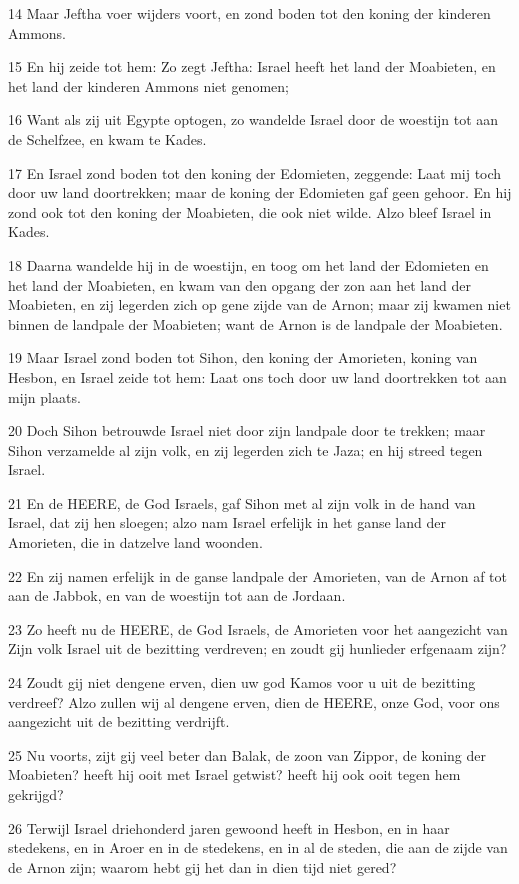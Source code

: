 \par 14 Maar Jeftha voer wijders voort, en zond boden tot den koning der kinderen Ammons.
\par 15 En hij zeide tot hem: Zo zegt Jeftha: Israel heeft het land der Moabieten, en het land der kinderen Ammons niet genomen;
\par 16 Want als zij uit Egypte optogen, zo wandelde Israel door de woestijn tot aan de Schelfzee, en kwam te Kades.
\par 17 En Israel zond boden tot den koning der Edomieten, zeggende: Laat mij toch door uw land doortrekken; maar de koning der Edomieten gaf geen gehoor. En hij zond ook tot den koning der Moabieten, die ook niet wilde. Alzo bleef Israel in Kades.
\par 18 Daarna wandelde hij in de woestijn, en toog om het land der Edomieten en het land der Moabieten, en kwam van den opgang der zon aan het land der Moabieten, en zij legerden zich op gene zijde van de Arnon; maar zij kwamen niet binnen de landpale der Moabieten; want de Arnon is de landpale der Moabieten.
\par 19 Maar Israel zond boden tot Sihon, den koning der Amorieten, koning van Hesbon, en Israel zeide tot hem: Laat ons toch door uw land doortrekken tot aan mijn plaats.
\par 20 Doch Sihon betrouwde Israel niet door zijn landpale door te trekken; maar Sihon verzamelde al zijn volk, en zij legerden zich te Jaza; en hij streed tegen Israel.
\par 21 En de HEERE, de God Israels, gaf Sihon met al zijn volk in de hand van Israel, dat zij hen sloegen; alzo nam Israel erfelijk in het ganse land der Amorieten, die in datzelve land woonden.
\par 22 En zij namen erfelijk in de ganse landpale der Amorieten, van de Arnon af tot aan de Jabbok, en van de woestijn tot aan de Jordaan.
\par 23 Zo heeft nu de HEERE, de God Israels, de Amorieten voor het aangezicht van Zijn volk Israel uit de bezitting verdreven; en zoudt gij hunlieder erfgenaam zijn?
\par 24 Zoudt gij niet dengene erven, dien uw god Kamos voor u uit de bezitting verdreef? Alzo zullen wij al dengene erven, dien de HEERE, onze God, voor ons aangezicht uit de bezitting verdrijft.
\par 25 Nu voorts, zijt gij veel beter dan Balak, de zoon van Zippor, de koning der Moabieten? heeft hij ooit met Israel getwist? heeft hij ook ooit tegen hem gekrijgd?
\par 26 Terwijl Israel driehonderd jaren gewoond heeft in Hesbon, en in haar stedekens, en in Aroer en in de stedekens, en in al de steden, die aan de zijde van de Arnon zijn; waarom hebt gij het dan in dien tijd niet gered?
